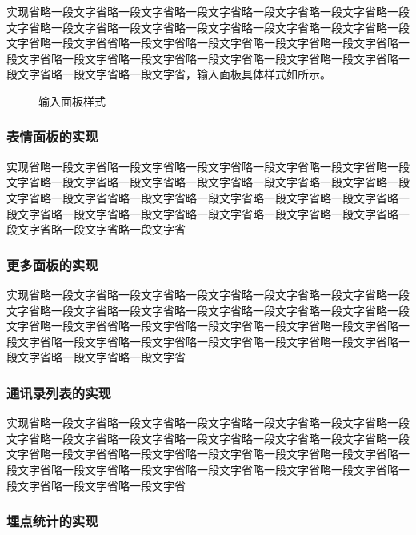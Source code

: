    	实现省略一段文字省略一段文字省略一段文字省略一段文字省略一段文字省略一段文字省略一段文字省略一段文字省略一段文字省略一段文字省略一段文字省略一段文字省略一段文字省省略一段文字省略一段文字省略一段文字省略一段文字省略一段文字省略一段文字省略一段文字省略一段文字省略一段文字省略一段文字省略一段文字省略一段文字省略一段文字省，输入面板具体样式如所示。
   	
   	\begin{figure}[H]
		\centering
		\caption{输入面板样式}
		\label{input_panel}
	\end{figure}
	
	
   	\subsubsection{表情面板的实现}
   	
   	实现省略一段文字省略一段文字省略一段文字省略一段文字省略一段文字省略一段文字省略一段文字省略一段文字省略一段文字省略一段文字省略一段文字省略一段文字省略一段文字省省略一段文字省略一段文字省略一段文字省略一段文字省略一段文字省略一段文字省略一段文字省略一段文字省略一段文字省略一段文字省略一段文字省略一段文字省略一段文字省   	
   	   	   	
   	\subsubsection{更多面板的实现}
   	
   	实现省略一段文字省略一段文字省略一段文字省略一段文字省略一段文字省略一段文字省略一段文字省略一段文字省略一段文字省略一段文字省略一段文字省略一段文字省略一段文字省省略一段文字省略一段文字省略一段文字省略一段文字省略一段文字省略一段文字省略一段文字省略一段文字省略一段文字省略一段文字省略一段文字省略一段文字省略一段文字省
   	    
   	\subsubsection{通讯录列表的实现}
   	
   	实现省略一段文字省略一段文字省略一段文字省略一段文字省略一段文字省略一段文字省略一段文字省略一段文字省略一段文字省略一段文字省略一段文字省略一段文字省略一段文字省省略一段文字省略一段文字省略一段文字省略一段文字省略一段文字省略一段文字省略一段文字省略一段文字省略一段文字省略一段文字省略一段文字省略一段文字省略一段文字省
    
	\subsubsection{埋点统计的实现}
	
